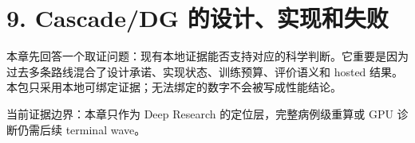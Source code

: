 \section{9. Cascade/DG 的设计、实现和失败}

本章先回答一个取证问题：现有本地证据能否支持对应的科学判断。它重要是因为过去多条路线混合了设计承诺、实现状态、训练预算、评价语义和 hosted 结果。本包只采用本地可绑定证据；无法绑定的数字不会被写成性能结论。



当前证据边界：本章只作为 Deep Research 的定位层，完整病例级重算或 GPU 诊断仍需后续 terminal wave。



\clearpage